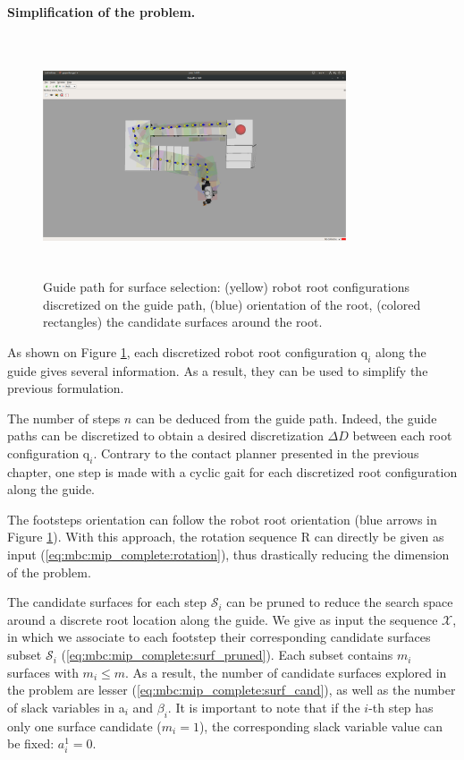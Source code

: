 \paragraph{Simplification of the problem.}
\begin{figure}[h!]
    \centering
    \captionsetup[subfigure]{justification=centering}
    \includegraphics[trim={15cm 5cm 18cm 7cm},clip,width=0.8\textwidth,height=7cm]{Figures/Chapter_MIP_SL1M/bauzil_guide_surfaces.png}
    \caption{Guide path for surface selection: (yellow) robot root configurations discretized on the guide path, (blue) orientation of the root, (colored rectangles) the candidate surfaces around the root.\label{fig:mip:bauzil_guide_surfaces}}
\end{figure}
As shown on Figure \ref{fig:mip:bauzil_guide_surfaces}, each discretized robot root configuration $\mbox{q}_i$ along the guide gives several information. As a result, they can be used to simplify the previous formulation.

The number of steps $n$ can be deduced from the guide path.
Indeed, the guide paths can be discretized to obtain a desired discretization $\Delta D$ between each root configuration $\mbox{q}_i$.
Contrary to the contact planner presented in the previous chapter, one step is made with a cyclic gait for each discretized root configuration along the guide.

The footsteps orientation can follow the robot root orientation (blue arrows in Figure \ref{fig:mip:bauzil_guide_surfaces}).
With this approach, the rotation sequence R can directly be given as input (\ref{eq:mbc:mip_complete:rotation}), thus drastically reducing the dimension of the problem.

The candidate surfaces for each step $\mathcal{S}_i$ can be pruned to reduce the search space around a discrete root location along the guide.
We give as input the sequence $\mathcal{X}$, in which we associate to each footstep their corresponding candidate surfaces subset $\mathcal{S}_i$ (\ref{eq:mbc:mip_complete:surf_pruned}). Each subset contains $m_i$ surfaces with $m_i \leq m$. 
As a result, the number of candidate surfaces explored in the problem are lesser (\ref{eq:mbc:mip_complete:surf_cand}), as well as the number of slack variables in a$_i$ and $\beta_i$.
It is important to note that if the $i$-th step has only one surface candidate ($m_i=1$), the corresponding slack variable value can be fixed: $a_i^1 = 0$.

